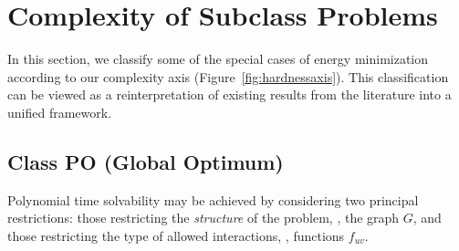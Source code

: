 \section{Complexity of Subclass Problems} \label{sec:specialcases}


In this section, we classify some of the special cases of energy minimization according to our complexity axis (Figure~\ref{fig:hardnessaxis}). This classification can be viewed as a reinterpretation of existing results from the literature into a unified framework.

\subsection{Class PO (Global Optimum)}

Polynomial time solvability may be achieved by considering two principal restrictions: those restricting the {\em structure} of the problem, \ie, the graph $G$, and those restricting the type of allowed interactions, \ie, functions $f_{uv}$.

